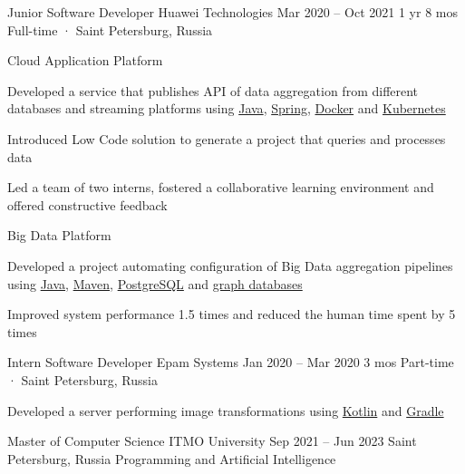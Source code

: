 \documentclass[11pt, a4paper]{style}
\begin{document}
\begin{paracol}{2}
    \cvEntry
        {Junior Software Developer} {Huawei Technologies}
        {Mar 2020 -- Oct 2021} {1 yr 8 mos}
        {Full-time · Saint Petersburg, Russia}
        {
            Cloud Application Platform \\
            \vspace{-5mm}
            \begin{cvItems}
                \item Developed a service that publishes API of data aggregation from different databases and streaming platforms using \underline{Java}, \underline{Spring}, \underline{Docker} and \underline{Kubernetes}
                \item Introduced Low Code solution to generate a project that queries and processes data
                \item Led a team of two interns, fostered a collaborative learning environment and offered constructive feedback
            \end{cvItems}
            \vspace{-1mm}
            Big Data Platform \\
            \vspace{-5mm}
            \begin{cvItems}
                \item Developed a project automating configuration of Big Data aggregation pipelines using \underline{Java}, \underline{Maven}, \underline{PostgreSQL} and \underline{graph databases}
                \item Improved system performance 1.5 times and reduced the human time spent by 5 times
            \end{cvItems}
        }

    \cvEntry
        {Intern Software Developer} {Epam Systems}
        {Jan 2020 -- Mar 2020} {3 mos}
        {Part-time · Saint Petersburg, Russia}
        {
            \begin{cvItems}
                \item Developed a server performing image transformations using \underline{Kotlin} and \underline{Gradle}
            \end{cvItems}
        }



    \cvEntry
        {Master of Computer Science} {ITMO University}
        {Sep 2021 -- Jun 2023} {}
        {Saint Petersburg, Russia}
        {
            \vspace{-1mm}
            Programming and Artificial Intelligence
        }


\end{paracol}
\end{document}

